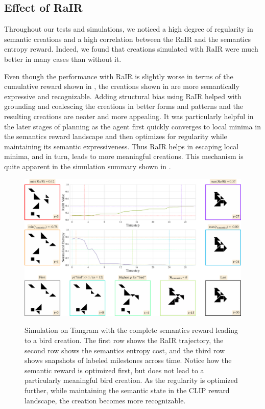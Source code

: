 \newpage
\subsection{Effect of RaIR}
\label{sec:effect-rair}

Throughout our tests and simulations, we noticed a high degree of regularity in semantic creations and a high correlation between the RaIR and the semantics entropy reward. 
Indeed, we found that creations simulated with RaIR were much better in many cases than without it.

Even though the performance with RaIR is slightly worse in terms of the cumulative reward shown in , the creations shown in  are more semantically expressive and recognizable.
Adding structural bias using RaIR helped with grounding and coalescing the creations in better forms and patterns and the resulting creations are neater and more appealing.
It was particularly helpful in the later stages of planning as the agent first quickly converges to local minima in the semantics reward landscape and then optimizes for regularity while maintaining its semantic expressiveness.
Thus RaIR helps in escaping local minima, and in turn, leads to more meaningful creations.
This mechanism is quite apparent in the simulation summary shown in .

\begin{figure}[h]
    \centering
    \href{https://drive.google.com/file/d/1zhw-571KImEE4OPbpeWEA9SAKPv4r7F3}{\includegraphics[width=\textwidth]{images/sim_rair_later_bird_cropped.pdf}}
    \caption[Simulation on Tangram with the complete semantics reward leading to a bird creation.]{Simulation on Tangram with the complete semantics reward leading to a bird creation. The first row shows the RaIR trajectory, the second row shows the semantics entropy cost, and the third row shows snapshots of labeled milestones across time. Notice how the semantic reward is optimized first, but does not lead to a particularly meaningful bird creation. As the regularity is optimized further, while maintaining the semantic state in the CLIP reward landscape, the creation becomes more recognizable.}
    \label{fig:sim}
\end{figure}

